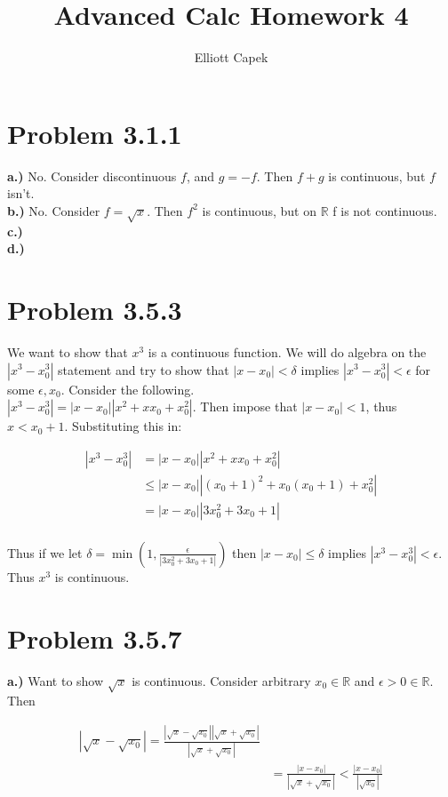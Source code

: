 \documentclass[10pt]{article} %
\title{Advanced Calc Homework 4}
\author{Elliott Capek}
\begin{document}
\maketitle{}

\section{Problem 3.1.1}
\textbf{a.)} No. Consider discontinuous $f$, and $g=-f$. Then $f+g$ is continuous, but $f$ isn't.\\

\textbf{b.)} No. Consider $f=\sqrt{x}$. Then $f^2$ is continuous, but on $\mathbb{R}$ f is not continuous.\\

\textbf{c.)} \\

\textbf{d.)} \\

\section{Problem 3.5.3}
We want to show that $x^3$ is a continuous function. We will do algebra on the $|x^3-x_0^3|$ statement and try to show that $|x-x_0|<\delta$ implies $|x^3-x_0^3|<\epsilon$ for some $\epsilon, x_0$. Consider the following.\\

$|x^3-x_0^3| = |x-x_0||x^2+xx_0+x_0^2|$. Then impose that $|x-x_0|<1$, thus $x<x_0+1$. Substituting this in:

\begin{align*}
  |x^3-x_0^3| &= |x-x_0||x^2+xx_0+x_0^2|\\
  &\leq |x-x_0||(x_0+1)^2+x_0(x_0+1)+x_0^2|\\
  &= |x-x_0||3x_0^2+3x_0+1|\\
\end{align*}

Thus if we let $\delta = \min(1,\frac{\epsilon}{|3x_0^2+3x_0+1|})$ then $|x-x_0|\leq\delta$ implies $|x^3-x_0^3|<\epsilon$. Thus $x^3$ is continuous.\\

\section{Problem 3.5.7}
\textbf{a.)} Want to show $\sqrt{x}$ is continuous. Consider arbitrary $x_0 \in \mathbb{R}$ and $\epsilon>0 \in \mathbb{R}$. Then

\begin{align*}
  |\sqrt{x} - \sqrt{x_0}| = \frac{|\sqrt{x} - \sqrt{x_0}||\sqrt{x} + \sqrt{x_0}|}{|\sqrt{x} + \sqrt{x_0}|}\\
  &= \frac{|x-x_0|}{|\sqrt{x} + \sqrt{x_0}|} < \frac{|x-x_0|}{|\sqrt{x_0}|}
\end{align*}
\end{document}
